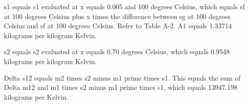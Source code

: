 s1 equals s1 evaluated at x equals 0.005 and 100 degrees Celsius, which equals sf at 100 degrees Celsius plus x times the difference between sg at 100 degrees Celsius and sf at 100 degrees Celsius. Refer to Table A-2. A1 equals 1.33714 kilograms per kilogram Kelvin.

s2 equals s2 evaluated at x equals 0.70 degrees Celsius, which equals 0.9548 kilograms per kilogram Kelvin.

Delta s12 equals m2 times s2 minus m1 prime times s1. This equals the sum of Delta m12 and m1 times s2 minus m1 prime times s1, which equals 13947.198 kilograms per Kelvin.